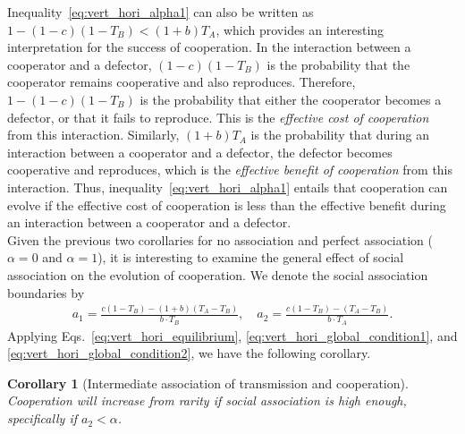 \documentclass[12pt]{extarticle}
\newtheorem{corollary}{Corollary}
\begin{document}
{%
Inequality~\ref{eq:vert_hori_alpha1} can also be written as
$1 - (1-c)(1-T_B) < (1+b) T_A$,
which provides an interesting interpretation for the success of cooperation. 
In the interaction between a cooperator and a defector, $(1-c)(1-T_B)$ is the probability that the cooperator remains cooperative and also reproduces. 
Therefore, $1 - (1-c)(1-T_B)$ is the probability that either the cooperator becomes a defector, or that it fails to reproduce.
This is the \emph{effective cost of cooperation} from this interaction.
Similarly, $(1+b) T_A$ is the probability that during an interaction between a cooperator and a defector, the defector becomes cooperative and reproduces, which is the \emph{effective benefit of cooperation} from this interaction.
Thus, inequality~\ref{eq:vert_hori_alpha1} entails that cooperation can evolve if the effective cost of cooperation is less than the effective benefit during an interaction between a cooperator and a defector.
\\

Given the previous two corollaries for no association and perfect association ($\alpha=0$ and $\alpha=1$), it is interesting to examine the general effect of social association on the evolution of cooperation.
We denote the social association boundaries by
\begin{equation}\begin{aligned}\label{eq:boundries_assortative_meeting}
  a_1 = \frac{c(1-T_B)-(1+b)(T_A-T_B)}{b\cdot T_B}, \quad
  a_2 = \frac{c(1-T_B)-(T_A-T_B)}{b\cdot T_A}.
\end{aligned}\end{equation}
Applying Eqs.~\ref{eq:vert_hori_equilibrium}, \ref{eq:vert_hori_global_condition1}, and \ref{eq:vert_hori_global_condition2}, we have the following corollary.
\\

\begin{corollary}[Intermediate association of transmission and cooperation]\label{corollary:intermediate_association}
Cooperation will increase from rarity if social association is high enough, specifically if $a_2 < \alpha$.
\end{corollary}

}
\end{document}
